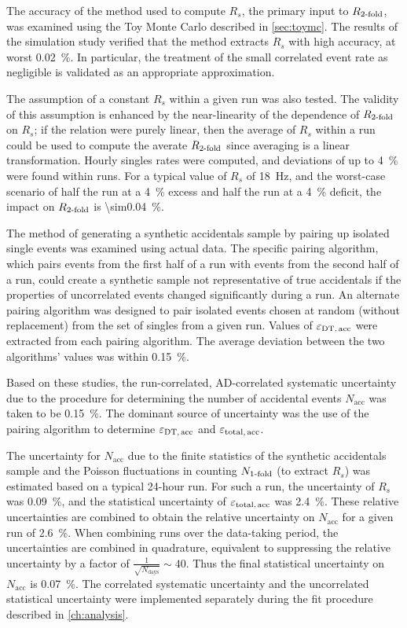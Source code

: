 The accuracy of the method used to compute $R_{s}$,
the primary input to $R_{\text{\ensuremath{2}-fold}}$,
was examined using the Toy Monte Carlo described in \cref{sec:toymc}.
The results of the simulation study verified that
the method extracts $R_s$ with high accuracy, at worst \SI{0.02}{\percent}.
In particular, the treatment of the small correlated event rate as negligible
is validated as an appropriate approximation.

The assumption of a constant $R_s$ within a given run was also tested.
The validity of this assumption is enhanced by the near-linearity of
the dependence of $R_{\text{\ensuremath{2}-fold}}$ on $R_s$;
if the relation were purely linear,
then the average of $R_s$ within a run could be used to compute
the averate $R_{\text{\ensuremath{2}-fold}}$ since averaging is a linear transformation.
Hourly singles rates were computed, and deviations of up to \SI{4}{\percent}
were found within runs.
For a typical value of $R_s$ of \SI{18}{\Hz},
and the worst-case scenario of half the run at a \SI{4}{\percent} excess
and half the run at a \SI{4}{\percent} deficit,
the impact on $R_{\text{\ensuremath{2}-fold}}$ is \SI{\sim0.04}{\percent}.

The method of generating a synthetic accidentals sample
by pairing up isolated single events was examined using actual data.
The specific pairing algorithm, which pairs events from the first half of a run
with events from the second half of a run,
could create a synthetic sample not representative of true accidentals
if the properties of uncorrelated events changed significantly during a run.
An alternate pairing algorithm was designed to pair isolated events
chosen at random (without replacement) from the set of singles from a given run.
Values of $\varepsilon_{\text{DT,\,acc}}$ were extracted from each pairing algorithm.
The average deviation between the two algorithms' values was within \SI{0.15}{\percent}.

Based on these studies, the run-correlated, AD-correlated systematic uncertainty
due to the procedure for determining the number of accidental events $N_{\text{acc}}$
was taken to be \SI{0.15}{\percent}.
The dominant source of uncertainty was the use of the pairing algorithm
to determine $\varepsilon_{\text{DT,\,acc}}$ and $\varepsilon_{\text{total,\,acc}}$.

The uncertainty for $N_{\text{acc}}$ due to the finite statistics
of the synthetic accidentals sample
and the Poisson fluctuations in counting $N_{\text{\ensuremath{1}-fold}}$
(to extract $R_s$)
was estimated based on a typical 24-hour run.
For such a run, the uncertainty of $R_s$ was \SI{0.09}{\percent},
and the statistical uncertainty of $\varepsilon_{\text{total,\,acc}}$
was \SI{2.4}{\percent}.
These relative uncertainties are combined to obtain
the relative uncertainty on $N_{\text{acc}}$ for a given run of \SI{2.6}{\percent}.
When combining runs over the data-taking period,
the uncertainties are combined in quadrature,
equivalent to suppressing the relative uncertainty by a factor of
$\frac{1}{\sqrt{N_{\text{days}}}} \sim 40$.
Thus the final statistical uncertainty on $N_{\text{acc}}$ is \SI{0.07}{\percent}.
The correlated systematic uncertainty and the uncorrelated statistical uncertainty
were implemented separately during the fit procedure described in \cref{ch:analysis}.

